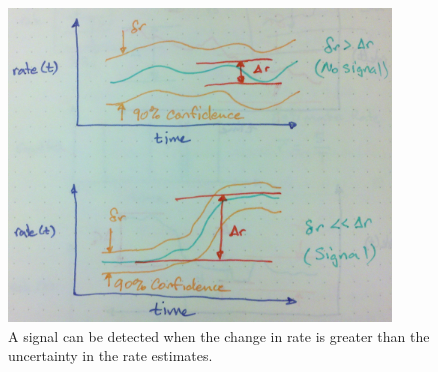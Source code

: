 \documentclass{article}
\begin{document}
\begin{figure}
    \centering
    \includegraphics[width=4.0in]{./imgs/signal.jpg}
        \caption{A signal can be detected when the change in rate is greater than the uncertainty in the rate estimates.}
    \label{fig:signal}
\end{figure}
\end{document}
